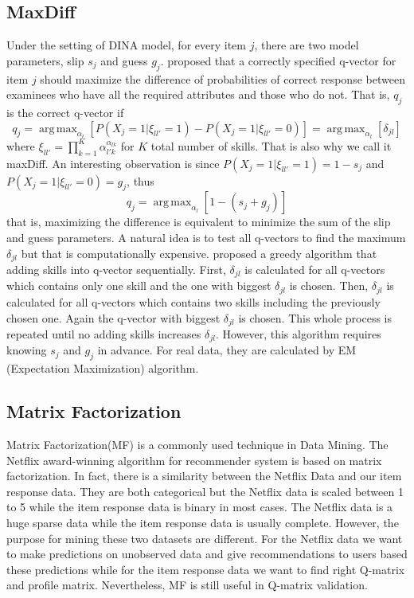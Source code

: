 \documentclass[11pt]{article}
\DeclareMathOperator*{\argmax}{arg\,max}
\begin{document}
\subsection{MaxDiff}
Under the setting of DINA model, for every item $j$, there are two model parameters, slip $s_j$ and guess $g_j$. \cite{de2008empirically} proposed that a correctly specified q-vector for item $j$ should maximize the difference of probabilities of correct response between examinees who have all the required attributes and those who do not. That is, $q_j$ is the correct q-vector if 
$$ q_j=\argmax_{\alpha _l}[P(X_j=1|\xi_{ll'}=1)-P(X_j=1|\xi_{ll'}=0)]=\argmax_{\alpha _l}[\delta_{jl}]$$
where $\xi_{ll'}=\prod_{k=1}^{K}\alpha_{l'k}^{\alpha_{lk}}$ for $K$ total number of skills. That is also why we call it maxDiff. An interesting observation is since $P(X_j=1|\xi_{ll'}=1)=1-s_j$ and $P(X_j=1|\xi_{ll'}=0)=g_j$, thus $$q_j=\argmax_{\alpha _l}[1-(s_j+g_j)]$$ 
that is, maximizing the difference is equivalent to minimize the sum of the slip and guess parameters. A natural idea is to test all q-vectors to find the maximum $\delta_{jl}$ but that is computationally expensive. \cite{de2008empirically} proposed a greedy algorithm that adding skills into q-vector sequentially. First, $\delta_{jl}$ is calculated for all q-vectors which contains only one skill and the one with biggest $\delta_{jl}$ is chosen. Then, $\delta_{jl}$ is calculated for all q-vectors which contains two skills including the previously chosen one. Again the q-vector with biggest $\delta_{jl}$ is chosen. This whole process is repeated until no adding skills increases $\delta_{jl}$. However, this algorithm requires knowing $s_j$ and $g_j$ in advance. For real data, they are calculated by EM (Expectation Maximization) algorithm\cite{de2009dina}.  

\subsection{Matrix Factorization}
Matrix Factorization(MF) is a commonly used technique in Data Mining. The Netflix award-winning algorithm for recommender system is based on matrix factorization\cite{koren2009matrix,desmarais2013matrix,desmarais2015combining}. In fact, there is a similarity between the Netflix Data and our item response data. They are both categorical but the Netflix data is scaled between 1 to 5 while the item response data is binary in most cases. The Netflix data is a huge sparse data while the item response data is usually complete. However, the purpose for mining these two datasets are different. For the Netflix data we want to make predictions on unobserved data and give recommendations to users based these predictions while for the item response data we want to find right Q-matrix and profile matrix. Nevertheless, MF is still useful in Q-matrix validation\cite{desmarais2014refinement}. 
\end{document}
